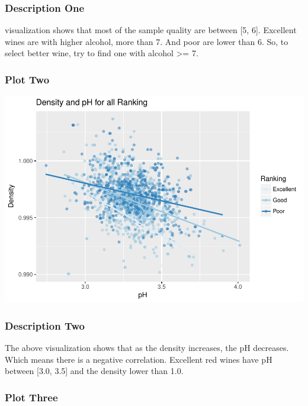 \documentclass[]{article}
\begin{document}
\subsubsection{Description One}\label{description-one}

visualization shows that most of the sample quality are between {[}5,
6{]}. Excellent wines are with higher alcohol, more than 7. And poor are
lower than 6. So, to select better wine, try to find one with alcohol
\textgreater{}= 7.

\subsubsection{Plot Two}\label{plot-two}

\includegraphics{RedWine_files/figure-latex/Plot_Two-1.pdf}

\subsubsection{Description Two}\label{description-two}

The above visualization shows that as the density increases, the pH
decreases. Which means there is a negative correlation. Excellent red
wines have pH between {[}3.0, 3.5{]} and the density lower than 1.0.

\subsubsection{Plot Three}\label{plot-three}
\end{document}
